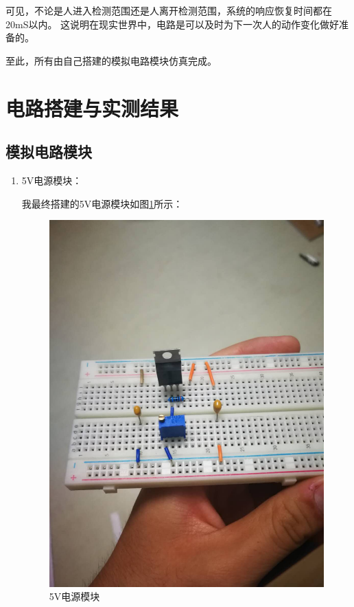 \documentclass{article}
\begin{document}
\begin{spacing}{1.5}
    可见，不论是人进入检测范围还是人离开检测范围，系统的响应恢复时间都在20mS以内。
    这说明在现实世界中，电路是可以及时为下一次人的动作变化做好准备的。

    至此，所有由自己搭建的模拟电路模块仿真完成。

\section{电路搭建与实测结果}

    \subsection{模拟电路模块}
\begin{enumerate}
    \item 5V电源模块：
    
    我最终搭建的5V电源模块如图\ref{fig:module1}所示：
    \begin{figure}[H]
        \centering
        \includegraphics[scale=0.1]{fig/result/module1.png}
        \caption{5V电源模块}
        \label{fig:module1}
    \end{figure}
    

\end{enumerate}
\end{spacing}
\end{document}
